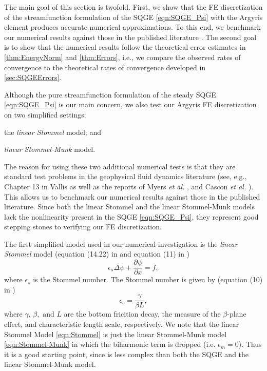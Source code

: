The main goal of this section is twofold. First, we show that the FE
discretization of the streamfunction formulation of the SQGE \eqref{eqn:SQGE_Psi}
with the Argyris element produces accurate numerical approximations. To this
end, we benchmark our numerical results against those in the published
literature \cite{Vallis06, Cascon, Myers}. The second goal is to show that the
numerical results follow the theoretical error estimates in
\autoref{thm:EnergyNorm} and \autoref{thm:Errors}, i.e., we compare the observed
rates of convergence to the theoretical rates of convergence developed in
\autoref{sec:SQGEErrors}.

Although the pure streamfunction formulation of the steady SQGE
\eqref{eqn:SQGE_Psi} is our main concern, we also test our Argyris FE
discretization on two simplified settings: \begin{inparaenum}[(i)] \item the
\emph{linear Stommel} model; and \item \emph{linear Stommel-Munk} model.
\end{inparaenum} The reason for using these two additional numerical tests is
that they are standard test problems in the geophysical fluid dynamics
literature (see, e.g., Chapter 13 in Vallis \cite{Vallis06} as well as the
reports of Myers \emph{et al.} \cite{Myers}, and Cascon \emph{et al.}
\cite{Cascon}). This allows us to benchmark our numerical results against
those in the published literature. Since both the linear Stommel and the
linear Stommel-Munk models lack the nonlinearity present in the SQGE
\eqref{eqn:SQGE_Psi}, they represent good stepping stones to verifying our FE
discretization.

The first simplified model used in our numerical investigation is the
\emph{linear Stommel} model (equation (14.22) in \cite{Vallis06} and equation
(11) in \cite{Myers})
\begin{equation}
  \epsilon_s \Delta \psi + \frac{\partial \psi}{\partial x} = f,
  \label{eqn:Stommel}
\end{equation}
where $\epsilon_s$ is the Stommel number. The Stommel number is given by
(equation (10) in \cite{Myers})
\begin{equation*}
  \epsilon_s = \frac{\gamma}{\beta L},
\end{equation*}
where $\gamma,\, \beta, \text{ and } L$ are the bottom fricition decay, the
measure of the $\beta$-plane effect, and characteristic length scale,
respectively. We note that the linear Stommel Model \eqref{eqn:Stommel} is just
the linear Stommel-Munk model \eqref{eqn:Stommel-Munk} in which the biharmonic
term is dropped (i.e. $\epsilon_m=0$). Thus it is a good starting point, since
is less complex than both the SQGE and the linear Stommel-Munk model.


